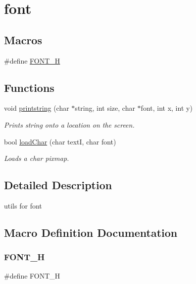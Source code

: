 \hypertarget{group__font}{}\section{font}
\label{group__font}
\subsection*{Macros}
\begin{DoxyCompactItemize}
\item 
\#define \mbox{\hyperlink{group__font_ga04b468e73da682ce30832fde541a9fd7}{F\+O\+N\+T\+\_\+H}}
\end{DoxyCompactItemize}
\subsection*{Functions}
\begin{DoxyCompactItemize}
\item 
void \mbox{\hyperlink{group__font_ga673023bd0075969c22f8aa5761f59908}{printstring}} (char $\ast$string, int size, char $\ast$font, int x, int y)
\begin{DoxyCompactList}\small\item\em Prints string onto a location on the screen. \end{DoxyCompactList}\item 
bool \mbox{\hyperlink{group__font_ga924391150c43d65d2a69422b57f0e9ca}{load\+Char}} (char textI, char font)
\begin{DoxyCompactList}\small\item\em Loads a char pixmap. \end{DoxyCompactList}\end{DoxyCompactItemize}


\subsection{Detailed Description}
utils for font 

\subsection{Macro Definition Documentation}
\mbox{\label{group__font_ga04b468e73da682ce30832fde541a9fd7}} 
\subsubsection{\texorpdfstring{FONT\_H}{FONT\_H}}
{\footnotesize\ttfamily \#define F\+O\+N\+T\+\_\+H}



